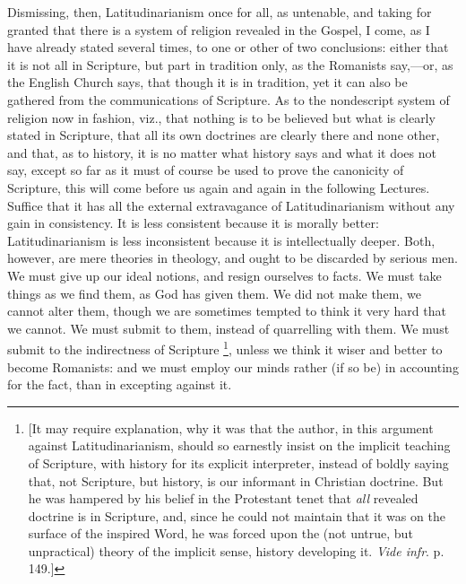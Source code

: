 Dismissing, then, Latitudinarianism once for all, as untenable, and
taking for granted that there is a system of religion revealed in the
Gospel, I come, as I have already stated several times, to one or
other of two conclusions: either that it is not all in Scripture, but
part in tradition only, as the Romanists say,—or, as the English
Church says, that though it is in tradition, yet it can also be
gathered from the communications of Scripture. As to the nondescript
system of religion now in fashion, viz., that nothing is to be
believed but what is clearly stated in Scripture, that all its own
doctrines are clearly there and none other, and that, as to history,
it is no matter what history says and what it does not say, except so
far as it must of course be used to prove the canonicity of Scripture,
this will come before us again and again in the following Lectures.
Suffice that it has all the external extravagance of Latitudinarianism
without any gain in consistency. It is less consistent because it is
morally better: Latitudinarianism is less inconsistent because it is
intellectually deeper. Both, however, are mere theories in theology,
and ought to be discarded by serious men. We must give up our ideal
notions, and resign ourselves to facts. We must take things as we find
them, as God has given them. We did not make them, we cannot alter
them, though we are sometimes tempted to think it very hard that we
cannot. We must submit to them, instead of quarrelling with them. We
must submit to the indirectness of Scripture \footnote{[It may require explanation, why it was that the author, in this
argument against Latitudinarianism, should so earnestly insist on the
implicit teaching of Scripture, with history for its explicit
interpreter, instead of boldly saying that, not Scripture, but
history, is our informant in Christian doctrine. But he was hampered
by his belief in the Protestant tenet that \emph{all} revealed
doctrine is in Scripture, and, since he could not maintain that it was
on the surface of the inspired Word, he was forced upon the (not
untrue, but unpractical) theory of the implicit sense, history
developing it. \emph{Vide infr}. p. 149.]},
unless we think it wiser and better to become Romanists: and we must
employ our minds rather (if so be) in accounting for the fact, than in
excepting against it.


